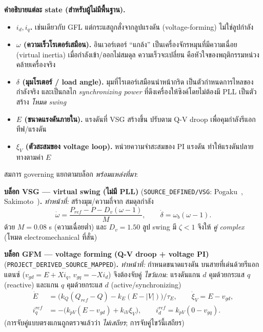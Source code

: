 \documentclass[12pt,a4paper]{article}
\begin{document}
\noindent\textbf{คำอธิบายแต่ละ state (สำหรับผู้ไม่มีพื้นฐาน).}
\begin{itemize}
  \item \textbf{$i_d,i_q$.} เช่นเดียวกับ GFL แต่กระแสถูกสั่งจากลูปแรงดัน (voltage-forming) ไม่ใช่ลูปกำลัง
  \item \textbf{$\omega$ (ความเร็วโรเตอร์เสมือน).} อินเวอร์เตอร์ ``แกล้ง'' เป็นเครื่องจักรหมุนที่มีความเฉื่อย
  (virtual inertia) เมื่อกำลังเข้า/ออกไม่สมดุล ความเร็วจะเปลี่ยน คือหัวใจของพฤติกรรมหน่วงคล้ายเครื่องจริง
  \item \textbf{$\delta$ (มุมโรเตอร์ / load angle).} มุมที่โรเตอร์เสมือนนำหน้ากริด เป็นตัวกำหนดการไหลของกำลังจริง
  และเป็นกลไก \emph{synchronizing power} ที่ดึงเครื่องให้ซิงค์โดยไม่ต้องมี PLL เป็นตัวสร้าง \emph{โหมด swing}
  \item \textbf{$E$ (ขนาดแรงดันภายใน).} แรงดันที่ VSG สร้างขึ้น ปรับตาม Q-V droop เพื่อคุมกำลังรีแอกทีฟ/แรงดัน
  \item \textbf{$\xi_{V}$ (ตัวสะสมของ voltage loop).} หน่วยความจำสะสมของ PI แรงดัน ทำให้แรงดันปลายทางตามค่า $E$
\end{itemize}

\noindent สมการ governing แยกตามบล็อก \emph{พร้อมแหล่งที่มา}:

\noindent\textbf{บล็อก VSG --- virtual swing (ไม่มี PLL)} (\texttt{SOURCE\_DEFINED/VSG}:
Pogaku~\cite{pogaku2007}, Sakimoto~\cite{sakimoto2015})\textbf{.} \emph{ทำหน้าที่:} สร้างมุม/ความถี่จาก
สมดุลกำลัง
\begin{equation}
\dot\omega = \frac{P_{ref}-P-D_v(\omega-1)}{M},\qquad
\dot\delta = \omega_b(\omega-1).
\label{eq:gfm-swing}
\end{equation}
ด้วย $M=0.08$ s (ความเฉื่อยต่ำ) และ $D_v=1.50$ ลูป swing มี $\zeta<1$ จึงให้ \emph{คู่ complex}
(โหมด electromechanical ที่สั่น)

\noindent\textbf{บล็อก GFM --- voltage forming (Q-V droop + voltage PI)} (\texttt{PROJECT\_DERIVED\_SOURCE\_MAPPED})\textbf{.}
\emph{ทำหน้าที่:} กำหนดขนาดแรงดัน บนสายที่เด่นด้วยรีแอกแตนซ์ ($v_{gd}=E+Xi_q$, $v_{gq}=-Xi_d$) จึงต้องจับคู่
\emph{ไขว้แกน}: แรงดันแกน $d$ คุมด้วยกระแส $q$ (reactive) และแกน $q$ คุมด้วยกระแส $d$ (active/synchronizing)
\begin{align}
\dot E &= \big(k_Q(Q_{ref}-Q)-k_E(E-|V|)\big)/\tau_E,\qquad \dot\xi_{V}=E-v_{gd},\\
i_q^{ref} &= -\big(k_{pV}(E-v_{gd})+k_{iV}\xi_{V}\big),\qquad
i_d^{ref} = k_{pV}(0-v_{gq}).
\end{align}
(การจับคู่แบบตรงแกนถูกตรวจแล้วว่า \emph{ไม่เสถียร}; การจับคู่ไขว้นี้เสถียร)
\end{document}
